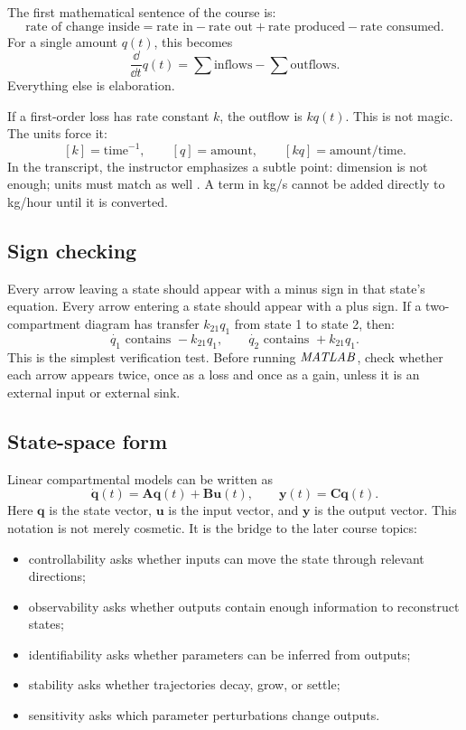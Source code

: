 \documentclass[a4paper]{article}
\newcommand{\ddt}{\frac{\dd}{\dd t}}
\newcommand{\vect}[1]{\boldsymbol{#1}}
\newcommand{\mat}[1]{\mathbf{#1}}
\newcommand{\MATLAB}{\ensuremath{\pksym{MATLAB}}}
\newcommand{\qone}{q_1}
\newcommand{\qtwo}{q_2}
\begin{document}
The first mathematical sentence of the course is:
\[
  \text{rate of change inside}
  =
  \text{rate in}
  -
  \text{rate out}
  +
  \text{rate produced}
  -
  \text{rate consumed}.
\]
For a single amount \(q(t)\), this becomes
\[
  \ddt q(t)=\sum \text{inflows}-\sum \text{outflows}.
\]
Everything else is elaboration.

If a first-order loss has rate constant \(k\), the outflow is \(kq(t)\). This is not magic. The units force it:
\[
  [k]=\mathrm{time}^{-1},\qquad [q]=\mathrm{amount},\qquad [kq]=\mathrm{amount}/\mathrm{time}.
\]
In the transcript, the instructor emphasizes a subtle point: dimension is not enough; units must match as well \cite{bmeg671TranscriptAug292025}. A term in kg/s cannot be added directly to kg/hour until it is converted.

\subsection{Sign checking}

Every arrow leaving a state should appear with a minus sign in that state's equation. Every arrow entering a state should appear with a plus sign. If a two-compartment diagram has transfer \(k_{21}\qone\) from state 1 to state 2, then:
\[
  \dot{\qone}\text{ contains }-k_{21}\qone,\qquad
  \dot{\qtwo}\text{ contains }+k_{21}\qone.
\]
This is the simplest verification test. Before running \MATLAB{}, check whether each arrow appears twice, once as a loss and once as a gain, unless it is an external input or external sink.

\subsection{State-space form}

Linear compartmental models can be written as
\[
  \dot{\vect q}(t)=\mat A\vect q(t)+\mat B\vect u(t),
  \qquad
  \vect y(t)=\mat C\vect q(t).
\]
Here \(\vect q\) is the state vector, \(\vect u\) is the input vector, and \(\vect y\) is the output vector. This notation is not merely cosmetic. It is the bridge to the later course topics:
\begin{itemize}[leftmargin=2em]
  \item controllability asks whether inputs can move the state through relevant directions;
  \item observability asks whether outputs contain enough information to reconstruct states;
  \item identifiability asks whether parameters can be inferred from outputs;
  \item stability asks whether trajectories decay, grow, or settle;
  \item sensitivity asks which parameter perturbations change outputs.
\end{itemize}
\end{document}
